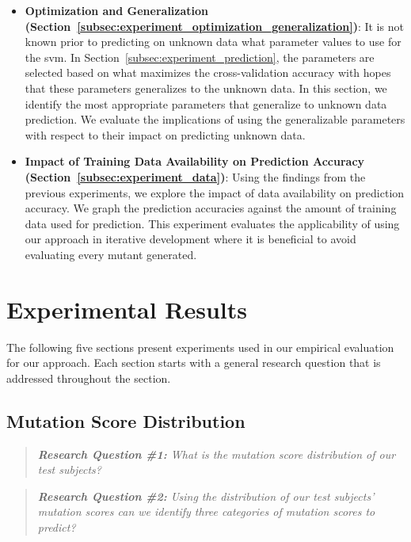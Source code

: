 \begin{itemize}
  \item \textbf{Optimization and Generalization (Section~\ref{subsec:experiment_optimization_generalization})}: It is not known prior to predicting on unknown data what parameter values to use for the \gls{svm}. In Section~\ref{subsec:experiment_prediction}, the parameters are selected based on what maximizes the cross-validation accuracy with hopes that these parameters generalizes to the unknown data. In this section, we identify the most appropriate parameters that generalize to unknown data prediction. We evaluate the implications of using the generalizable parameters with respect to their impact on predicting unknown data.
  \item \textbf{Impact of Training Data Availability on Prediction Accuracy (Section~\ref{subsec:experiment_data})}: Using the findings from the previous experiments, we explore the impact of data availability on prediction accuracy. We graph the prediction accuracies against the amount of training data used for prediction. This experiment evaluates the applicability of using our approach in iterative development where it is beneficial to avoid evaluating every mutant generated.
\end{itemize}


\section{Experimental Results}
\label{sec:experiment_results}
The following five sections present experiments used in our empirical evaluation for our approach. Each section starts with a general research question that is addressed throughout the section.


\subsection{Mutation Score Distribution}
\label{subsec:experiment_mutation_score_distribution}
\begin{quote}
  \emph{\textbf{Research Question \#1:} What is the mutation score distribution of our test subjects?}
\end{quote}

\begin{quote}
  \emph{\textbf{Research Question \#2:} Using the distribution of our test subjects' mutation scores can we identify three categories of mutation scores to predict?}
\end{quote}


